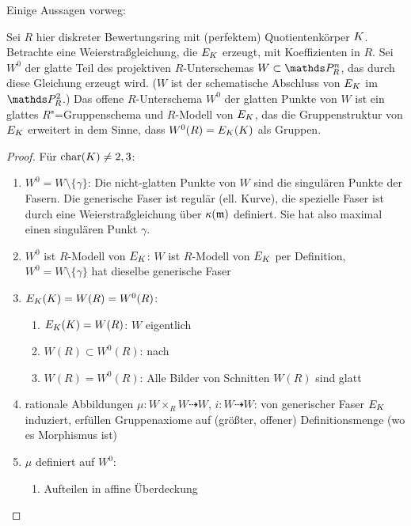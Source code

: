 \documentclass[german]{scrreprt}
\begin{document}
Einige Aussagen vorweg:
\begin{Lemma}\label{thm:erweiterunggruppenstruktur}
  Sei $R$ hier diskreter Bewertungsring mit (perfektem) Quotientenkörper
  $K$.
  Betrachte eine Weierstraßgleichung, die $E_{K}$ erzeugt, mit
  Koeffizienten in $R$.
  Sei $W^0$ der glatte Teil des projektiven $R$-Unterschemas
  $W\subset\P_R^n$, das durch diese Gleichung erzeugt wird.
  ($W$ ist der schematische Abschluss von $E_{K}$ im $\P_R^2$.)
  Das offene $R$-Unterschema $W^0$ der glatten Punkte von $W$ ist ein
  glattes $R$"=Gruppenschema und $R$-Modell von $E_{K}$, das die
  Gruppenstruktur von $E_{K}$ erweitert in dem
  Sinne, dass $W^0(R)=E_{K}(K)$ als Gruppen.
  \cite[Theorem IV.5.3 (c)]{silverman2}
  \begin{proof} Für $\operatorname{char}(K)\neq 2,3$:
    \begin{enumerate}
    \item $W^0=W\setminus\{\gamma\}$:
      \cite[Remark IV.5.4.2]{silverman2}
      Die nicht-glatten Punkte von $W$ sind die singulären Punkte
      der Fasern.
      Die generische Faser ist regulär (ell. Kurve), die spezielle
      Faser ist durch eine Weierstraßgleichung über $\kappa(\mathfrak{m})$
      definiert. Sie hat also maximal einen singulären Punkt $\gamma$.
      \cite[Proposition III.1.4 (a)]{silverman}
    \item $W^0$ ist $R$-Modell von $E_{K}$:
      $W$ ist $R$-Modell von $E_{K}$ per Definition,
      $W^0=W\setminus\{\gamma\}$ hat dieselbe generische Faser
    \item \cite[Corollary IV.4.4]{silverman2}
      $E_{K}(K)=W(R)=W^0(R)$:
      \begin{enumerate}
      \item $E_{K}(K)=W(R)$: $W$ eigentlich
      \item $W(R)\subset W^0(R)$:
        nach \cite[Proposition IV.4.3 (b)]{silverman2}
      \item $W(R)=W^0(R)$: Alle Bilder von Schnitten $W(R)$ sind
        glatt
      \end{enumerate}
    \item rationale Abbildungen
      $\mu\colon W\times_R W\dashrightarrow W$,
      $i\colon W\dashrightarrow W$:
      von generischer Faser $E_{K}$ induziert, erfüllen Gruppenaxiome
      auf (größter, offener) Definitionsmenge (wo es Morphismus ist)
    \item $\mu$ definiert auf $W^0$:
      \begin{enumerate}
      \item Aufteilen in affine Überdeckung

\end{enumerate}
\end{enumerate}
\end{proof}
\end{Lemma}
\end{document}
